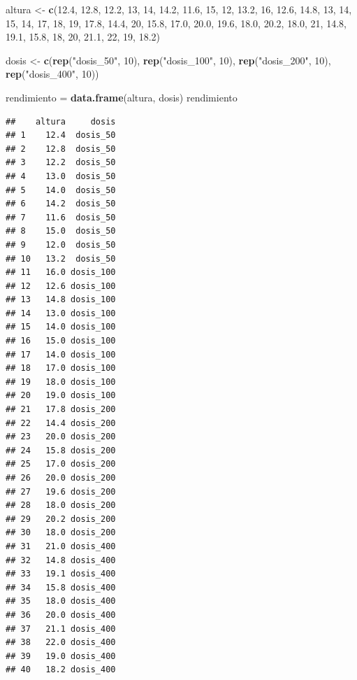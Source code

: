\documentclass[
]{book}
\newenvironment{Shaded}{\begin{snugshade}}{\end{snugshade}}
\newcommand{\DecValTok}[1]{\textcolor[rgb]{0.00,0.00,0.81}{#1}}
\newcommand{\FloatTok}[1]{\textcolor[rgb]{0.00,0.00,0.81}{#1}}
\newcommand{\FunctionTok}[1]{\textcolor[rgb]{0.13,0.29,0.53}{\textbf{#1}}}
\newcommand{\NormalTok}[1]{#1}
\newcommand{\OtherTok}[1]{\textcolor[rgb]{0.56,0.35,0.01}{#1}}
\newcommand{\StringTok}[1]{\textcolor[rgb]{0.31,0.60,0.02}{#1}}
\begin{document}
\begin{Shaded}
\begin{Highlighting}[]
\NormalTok{altura }\OtherTok{\textless{}{-}} \FunctionTok{c}\NormalTok{(}\FloatTok{12.4}\NormalTok{, }\FloatTok{12.8}\NormalTok{, }\FloatTok{12.2}\NormalTok{, }\DecValTok{13}\NormalTok{, }\DecValTok{14}\NormalTok{, }\FloatTok{14.2}\NormalTok{, }\FloatTok{11.6}\NormalTok{, }\DecValTok{15}\NormalTok{, }\DecValTok{12}\NormalTok{, }\FloatTok{13.2}\NormalTok{, }
            \DecValTok{16}\NormalTok{, }\FloatTok{12.6}\NormalTok{, }\FloatTok{14.8}\NormalTok{, }\DecValTok{13}\NormalTok{, }\DecValTok{14}\NormalTok{, }\DecValTok{15}\NormalTok{, }\DecValTok{14}\NormalTok{, }\DecValTok{17}\NormalTok{, }\DecValTok{18}\NormalTok{, }\DecValTok{19}\NormalTok{, }\FloatTok{17.8}\NormalTok{, }\FloatTok{14.4}\NormalTok{, }
            \DecValTok{20}\NormalTok{, }\FloatTok{15.8}\NormalTok{, }\FloatTok{17.0}\NormalTok{, }\FloatTok{20.0}\NormalTok{, }\FloatTok{19.6}\NormalTok{, }\FloatTok{18.0}\NormalTok{, }\FloatTok{20.2}\NormalTok{, }\FloatTok{18.0}\NormalTok{, }\DecValTok{21}\NormalTok{, }\FloatTok{14.8}\NormalTok{, }
            \FloatTok{19.1}\NormalTok{, }\FloatTok{15.8}\NormalTok{, }\DecValTok{18}\NormalTok{, }\DecValTok{20}\NormalTok{, }\FloatTok{21.1}\NormalTok{, }\DecValTok{22}\NormalTok{, }\DecValTok{19}\NormalTok{, }\FloatTok{18.2}\NormalTok{)}

\NormalTok{dosis }\OtherTok{\textless{}{-}} \FunctionTok{c}\NormalTok{(}\FunctionTok{rep}\NormalTok{(}\StringTok{"dosis\_50"}\NormalTok{, }\DecValTok{10}\NormalTok{), }\FunctionTok{rep}\NormalTok{(}\StringTok{"dosis\_100"}\NormalTok{, }\DecValTok{10}\NormalTok{), }
           \FunctionTok{rep}\NormalTok{(}\StringTok{"dosis\_200"}\NormalTok{, }\DecValTok{10}\NormalTok{), }\FunctionTok{rep}\NormalTok{(}\StringTok{"dosis\_400"}\NormalTok{, }\DecValTok{10}\NormalTok{))}

\NormalTok{rendimiento }\OtherTok{=} \FunctionTok{data.frame}\NormalTok{(altura, dosis)}
\NormalTok{rendimiento}
\end{Highlighting}
\end{Shaded}

\begin{verbatim}
##    altura     dosis
## 1    12.4  dosis_50
## 2    12.8  dosis_50
## 3    12.2  dosis_50
## 4    13.0  dosis_50
## 5    14.0  dosis_50
## 6    14.2  dosis_50
## 7    11.6  dosis_50
## 8    15.0  dosis_50
## 9    12.0  dosis_50
## 10   13.2  dosis_50
## 11   16.0 dosis_100
## 12   12.6 dosis_100
## 13   14.8 dosis_100
## 14   13.0 dosis_100
## 15   14.0 dosis_100
## 16   15.0 dosis_100
## 17   14.0 dosis_100
## 18   17.0 dosis_100
## 19   18.0 dosis_100
## 20   19.0 dosis_100
## 21   17.8 dosis_200
## 22   14.4 dosis_200
## 23   20.0 dosis_200
## 24   15.8 dosis_200
## 25   17.0 dosis_200
## 26   20.0 dosis_200
## 27   19.6 dosis_200
## 28   18.0 dosis_200
## 29   20.2 dosis_200
## 30   18.0 dosis_200
## 31   21.0 dosis_400
## 32   14.8 dosis_400
## 33   19.1 dosis_400
## 34   15.8 dosis_400
## 35   18.0 dosis_400
## 36   20.0 dosis_400
## 37   21.1 dosis_400
## 38   22.0 dosis_400
## 39   19.0 dosis_400
## 40   18.2 dosis_400
\end{verbatim}
\end{document}
